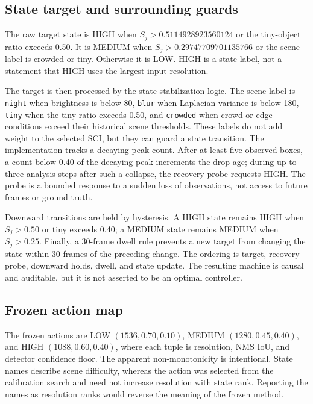 \subsection{State target and surrounding guards}
The raw target state is HIGH when $S_j>0.5114928923560124$ or the tiny-object ratio exceeds 0.50. It is MEDIUM when $S_j>0.29747709701135766$ or the scene label is crowded or tiny. Otherwise it is LOW. HIGH is a state label, not a statement that HIGH uses the largest input resolution.

The target is then processed by the state-stabilization logic. The scene label is \texttt{night} when brightness is below 80, \texttt{blur} when Laplacian variance is below 180, \texttt{tiny} when the tiny ratio exceeds 0.50, and \texttt{crowded} when crowd or edge conditions exceed their historical scene thresholds. These labels do not add weight to the selected SCI, but they can guard a state transition. The implementation tracks a decaying peak count. After at least five observed boxes, a count below 0.40 of the decaying peak increments the drop age; during up to three analysis steps after such a collapse, the recovery probe requests HIGH. The probe is a bounded response to a sudden loss of observations, not access to future frames or ground truth.

Downward transitions are held by hysteresis. A HIGH state remains HIGH when $S_j>0.50$ or tiny exceeds 0.40; a MEDIUM state remains MEDIUM when $S_j>0.25$. Finally, a 30-frame dwell rule prevents a new target from changing the state within 30 frames of the preceding change. The ordering is target, recovery probe, downward holds, dwell, and state update. The resulting machine is causal and auditable, but it is not asserted to be an optimal controller.

\subsection{Frozen action map}
The frozen actions are LOW $(1536,0.70,0.10)$, MEDIUM $(1280,0.45,0.40)$, and HIGH $(1088,0.60,0.40)$, where each tuple is resolution, NMS IoU, and detector confidence floor. The apparent non-monotonicity is intentional. State names describe scene difficulty, whereas the action was selected from the calibration search and need not increase resolution with state rank. Reporting the names as resolution ranks would reverse the meaning of the frozen method.

